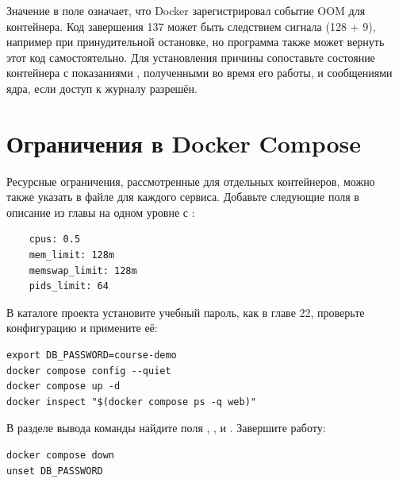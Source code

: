 Значение  в поле  означает, что Docker зарегистрировал событие OOM для контейнера. Код завершения 137 может быть следствием сигнала  (128 + 9), например при принудительной остановке, но программа также может вернуть этот код самостоятельно. Для установления причины сопоставьте состояние контейнера с показаниями , полученными во время его работы, и сообщениями ядра, если доступ к журналу разрешён.

\section{Ограничения в Docker Compose}

Ресурсные ограничения, рассмотренные для отдельных контейнеров, можно также указать в файле  для каждого сервиса. Добавьте следующие поля в описание  из главы  на одном уровне с :
\par\addvspace{10pt}\noindent\begin{minipage}{\linewidth}
\begin{verbatim}
    cpus: 0.5
    mem_limit: 128m
    memswap_limit: 128m
    pids_limit: 64
\end{verbatim}
\end{minipage}\par\addvspace{10pt}

\par\addvspace{10pt}\noindent\begin{minipage}{\linewidth}
\setlength{\parindent}{0pt}\noindent\hspace*{1.25cm}В каталоге проекта установите учебный пароль, как в главе 22, проверьте конфигурацию и примените её:\par\kern 10pt
\begin{verbatim}
export DB_PASSWORD=course-demo
docker compose config --quiet
docker compose up -d
docker inspect "$(docker compose ps -q web)"
\end{verbatim}
\end{minipage}\par\addvspace{10pt}
В разделе  вывода команды  найдите поля , ,  и . Завершите работу:
\par\addvspace{10pt}\noindent\begin{minipage}{\linewidth}
\begin{verbatim}
docker compose down
unset DB_PASSWORD
\end{verbatim}
\end{minipage}\par\addvspace{10pt}


